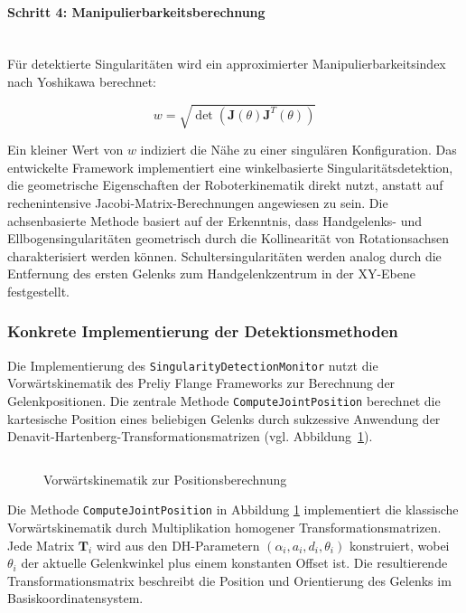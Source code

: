 \paragraph{Schritt 4: Manipulierbarkeitsberechnung}~\\
Für detektierte Singularitäten wird ein approximierter Manipulierbarkeitsindex
nach Yoshikawa berechnet:

\begin{equation}
  w = \sqrt{\det(\mathbf{J}(\theta)\mathbf{J}^T(\theta))}
  \label{eq:manipulability}
\end{equation}

Ein kleiner Wert von $w$ indiziert die Nähe zu einer singulären Konfiguration.
Das entwickelte Framework implementiert eine winkelbasierte
Singularitätsdetektion, die geometrische Eigenschaften der Roboterkinematik
direkt nutzt, anstatt auf rechenintensive Jacobi-Matrix-Berechnungen angewiesen
zu sein. Die achsenbasierte Methode basiert auf der Erkenntnis, dass
Handgelenks- und Ellbogensingularitäten geometrisch durch die
Kollinearität von Rotationsachsen
charakterisiert werden können. Schultersingularitäten werden analog durch die
Entfernung des ersten Gelenks zum Handgelenkzentrum in der XY-Ebene
festgestellt.

\subsubsection{Konkrete Implementierung der Detektionsmethoden}
\label{sssec:Implementierung_Detektionsmethoden}
Die Implementierung des \texttt{SingularityDetectionMonitor} nutzt die
Vorwärtskinematik des Preliy Flange Frameworks zur Berechnung der
Gelenkpositionen. Die zentrale Methode \texttt{ComputeJointPosition} berechnet
die kartesische Position eines beliebigen Gelenks durch sukzessive Anwendung
der Denavit-Hartenberg-Transformationsmatrizen (vgl.
Abbildung~\ref{listing:forwardKinematic}).

\begin{figure}[H]
  \inputminted[fontsize=\footnotesize]{csharp}{code-snippets/CalculateJointPos.cs}
  \caption{Vorwärtskinematik zur Positionsberechnung}
  \label{listing:forwardKinematic}
\end{figure}

Die Methode \texttt{ComputeJointPosition} in Abbildung
\ref{listing:forwardKinematic} implementiert die klassische
Vorwärtskinematik durch
Multiplikation homogener Transformationsmatrizen. Jede Matrix $\mathbf{T}_i$
wird aus den DH-Parametern $(\alpha_i, a_i, d_i, \theta_i)$ konstruiert, wobei
$\theta_i$ der aktuelle Gelenkwinkel plus einem konstanten Offset ist. Die
resultierende Transformationsmatrix beschreibt die Position und Orientierung des
Gelenks im Basiskoordinatensystem.\\

